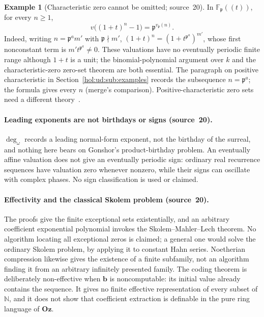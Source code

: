 \documentclass[11pt]{article}
\numberwithin{equation}{section}
\theoremstyle{definition}
\newtheorem{example}[theorem]{Example}
\theoremstyle{remark}
\newcommand{\N}{\mathbb N}
\newcommand{\Oz}{\mathbf{Oz}}
\begin{document}
\begin{example}[Characteristic zero cannot be omitted; source~20]
\label{hol:rc:ex:charp}
In $\mathbb F_{\mathfrak p}((t))$, for every $n\ge1$,
\[
 v\bigl((1+t)^n-1\bigr)=\mathfrak p^{v_{\mathfrak p}(n)} .
\]
Indeed, writing $n=\mathfrak p^am'$ with $\mathfrak p\nmid m'$,
$(1+t)^n=(1+t^{\mathfrak p^a})^{m'}$, whose first nonconstant term is
$m't^{\mathfrak p^a}\ne0$. These valuations have no eventually periodic finite
range although $1+t$ is a unit; the binomial-polynomial argument over $k$ and
the characteristic-zero zero-set theorem are both essential. The paragraph on
positive characteristic in Section~\ref{hol:ud:sub:examples} records the
subsequence $n=\mathfrak p^a$; the formula gives every $n$ (merge's
comparison). Positive-characteristic zero sets need a different
theory~\cite{derksen}.
\end{example}

\paragraph{Leading exponents are not birthdays or signs (source~20).}
$\deg_\omega$ records a leading normal-form exponent, not the birthday of the
surreal, and nothing here bears on Gonshor's product-birthday problem. An
eventually affine valuation does not give an eventually periodic sign:
ordinary real recurrence sequences have valuation zero whenever nonzero, while
their signs can oscillate with complex phases. No sign classification is used
or claimed.

\paragraph{Effectivity and the classical Skolem problem (source~20).}
The proofs give the finite exceptional sets existentially, and an arbitrary
coefficient exponential polynomial invokes the Skolem--Mahler--Lech theorem.
No algorithm locating all exceptional zeros is claimed; a general one would
solve the ordinary Skolem problem, by applying it to constant Hahn series.
Noetherian compression likewise gives the existence of a finite subfamily, not
an algorithm finding it from an arbitrary infinitely presented family. The
coding theorem is deliberately non-effective when $\mathbf b$ is
noncomputable: its initial value already contains the sequence. It gives no
finite effective representation of every subset of $\N$, and it does not show
that coefficient extraction is definable in the pure ring language of $\Oz$.
\end{document}
